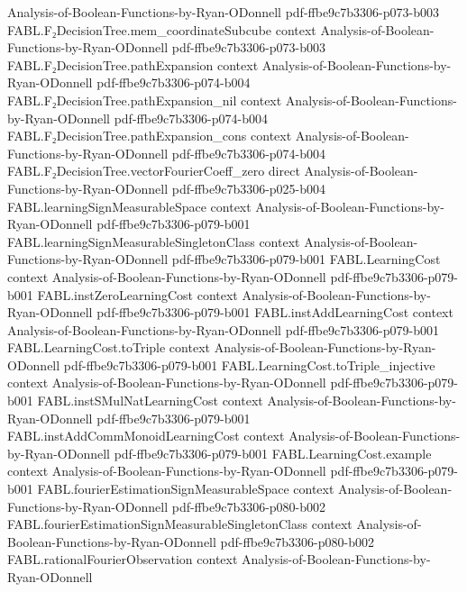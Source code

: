 \begin{theorem}
  {Analysis-of-Boolean-Functions-by-Ryan-ODonnell}
  {pdf-ffbe9c7b3306-p073-b003}
\proofstep
  {FABL.F₂DecisionTree.mem_coordinateSubcube}
  {context}
  {Analysis-of-Boolean-Functions-by-Ryan-ODonnell}
  {pdf-ffbe9c7b3306-p073-b003}
\proofstep
  {FABL.F₂DecisionTree.pathExpansion}
  {context}
  {Analysis-of-Boolean-Functions-by-Ryan-ODonnell}
  {pdf-ffbe9c7b3306-p074-b004}
\proofstep
  {FABL.F₂DecisionTree.pathExpansion_nil}
  {context}
  {Analysis-of-Boolean-Functions-by-Ryan-ODonnell}
  {pdf-ffbe9c7b3306-p074-b004}
\proofstep
  {FABL.F₂DecisionTree.pathExpansion_cons}
  {context}
  {Analysis-of-Boolean-Functions-by-Ryan-ODonnell}
  {pdf-ffbe9c7b3306-p074-b004}
\proofstep
  {FABL.F₂DecisionTree.vectorFourierCoeff_zero}
  {direct}
  {Analysis-of-Boolean-Functions-by-Ryan-ODonnell}
  {pdf-ffbe9c7b3306-p025-b004}
\proofstep
  {FABL.learningSignMeasurableSpace}
  {context}
  {Analysis-of-Boolean-Functions-by-Ryan-ODonnell}
  {pdf-ffbe9c7b3306-p079-b001}
\proofstep
  {FABL.learningSignMeasurableSingletonClass}
  {context}
  {Analysis-of-Boolean-Functions-by-Ryan-ODonnell}
  {pdf-ffbe9c7b3306-p079-b001}
\proofstep
  {FABL.LearningCost}
  {context}
  {Analysis-of-Boolean-Functions-by-Ryan-ODonnell}
  {pdf-ffbe9c7b3306-p079-b001}
\proofstep
  {FABL.instZeroLearningCost}
  {context}
  {Analysis-of-Boolean-Functions-by-Ryan-ODonnell}
  {pdf-ffbe9c7b3306-p079-b001}
\proofstep
  {FABL.instAddLearningCost}
  {context}
  {Analysis-of-Boolean-Functions-by-Ryan-ODonnell}
  {pdf-ffbe9c7b3306-p079-b001}
\proofstep
  {FABL.LearningCost.toTriple}
  {context}
  {Analysis-of-Boolean-Functions-by-Ryan-ODonnell}
  {pdf-ffbe9c7b3306-p079-b001}
\proofstep
  {FABL.LearningCost.toTriple_injective}
  {context}
  {Analysis-of-Boolean-Functions-by-Ryan-ODonnell}
  {pdf-ffbe9c7b3306-p079-b001}
\proofstep
  {FABL.instSMulNatLearningCost}
  {context}
  {Analysis-of-Boolean-Functions-by-Ryan-ODonnell}
  {pdf-ffbe9c7b3306-p079-b001}
\proofstep
  {FABL.instAddCommMonoidLearningCost}
  {context}
  {Analysis-of-Boolean-Functions-by-Ryan-ODonnell}
  {pdf-ffbe9c7b3306-p079-b001}
\proofstep
  {FABL.LearningCost.example}
  {context}
  {Analysis-of-Boolean-Functions-by-Ryan-ODonnell}
  {pdf-ffbe9c7b3306-p079-b001}
\proofstep
  {FABL.fourierEstimationSignMeasurableSpace}
  {context}
  {Analysis-of-Boolean-Functions-by-Ryan-ODonnell}
  {pdf-ffbe9c7b3306-p080-b002}
\proofstep
  {FABL.fourierEstimationSignMeasurableSingletonClass}
  {context}
  {Analysis-of-Boolean-Functions-by-Ryan-ODonnell}
  {pdf-ffbe9c7b3306-p080-b002}
\proofstep
  {FABL.rationalFourierObservation}
  {context}
  {Analysis-of-Boolean-Functions-by-Ryan-ODonnell}

\end{theorem}
